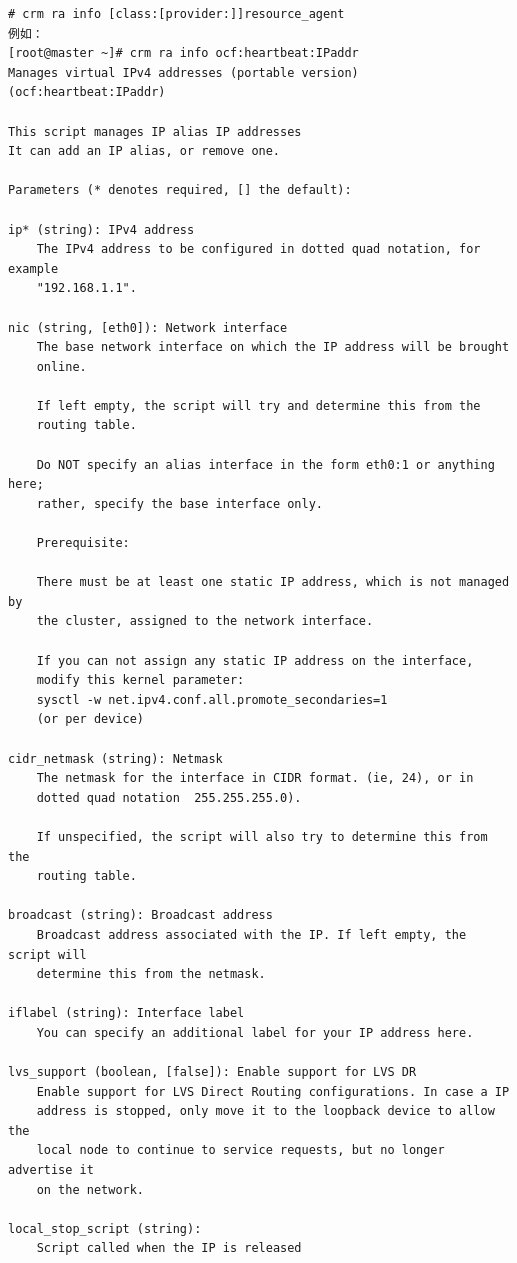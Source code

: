 \begin{verbatim}
# crm ra info [class:[provider:]]resource_agent
例如：
[root@master ~]# crm ra info ocf:heartbeat:IPaddr
Manages virtual IPv4 addresses (portable version) (ocf:heartbeat:IPaddr)

This script manages IP alias IP addresses
It can add an IP alias, or remove one.

Parameters (* denotes required, [] the default):

ip* (string): IPv4 address
    The IPv4 address to be configured in dotted quad notation, for example
    "192.168.1.1".

nic (string, [eth0]): Network interface
    The base network interface on which the IP address will be brought
    online.
    
    If left empty, the script will try and determine this from the
    routing table.
    
    Do NOT specify an alias interface in the form eth0:1 or anything here;
    rather, specify the base interface only.
    
    Prerequisite:
    
    There must be at least one static IP address, which is not managed by
    the cluster, assigned to the network interface.
    
    If you can not assign any static IP address on the interface,
    modify this kernel parameter:
    sysctl -w net.ipv4.conf.all.promote_secondaries=1
    (or per device)

cidr_netmask (string): Netmask
    The netmask for the interface in CIDR format. (ie, 24), or in
    dotted quad notation  255.255.255.0).
    
    If unspecified, the script will also try to determine this from the
    routing table.

broadcast (string): Broadcast address
    Broadcast address associated with the IP. If left empty, the script will
    determine this from the netmask.

iflabel (string): Interface label
    You can specify an additional label for your IP address here.

lvs_support (boolean, [false]): Enable support for LVS DR
    Enable support for LVS Direct Routing configurations. In case a IP
    address is stopped, only move it to the loopback device to allow the
    local node to continue to service requests, but no longer advertise it
    on the network.

local_stop_script (string): 
    Script called when the IP is released


\end{verbatim}

